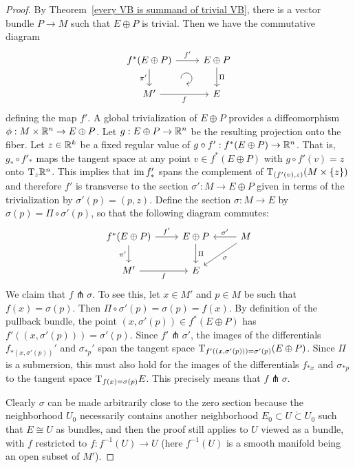 \begin{proof}
By Theorem~\ref{every VB is summand of trivial VB}, there is a vector bundle $P{\to} M$ such that $E\oplus P$ is trivial. Then we have the commutative diagram
    \[\begin{tikzcd}[every matrix/.append style={name=m}, execute at end picture={\draw [<-] ([xshift=-11mm,yshift=1mm]m-2-2.north) arc[start angle=-90,delta angle=270,radius=0.2cm];}]
    f^\ast(E\oplus P) \arrow[r,"f'"]\arrow[d,swap,"\pi'"]& E\oplus P\arrow[d,"\Pi"] \\
    M'\arrow[r,swap,"f"]& E
    \end{tikzcd}\]
defining the map $f'$. A global trivialization of $E\oplus P$ provides a diffeomorphism $\phi:M\times\mathbb{R}^n\to E\oplus P$. Let $g:E\oplus P\to\mathbb{R}^n$ be the resulting projection onto the fiber. Let $z\in\mathbb{R}^k$ be a fixed regular value of $g\circ f':f^\ast(E\oplus P)\to\mathbb{R}^n$. That is, $g_\ast \circ f'_\ast$ maps the tangent space at any point $v\in f^\ast(E\oplus P)$ with $g\circ f'(v)=z$ onto $\mathrm{T}_z\mathbb{R}^n$. This implies that $\operatorname{im} f_\ast '$ spans the complement of $\mathrm{T}_{(f'(v),z)}(M\times\{z\})$ and therefore $f'$ is transverse to the section $\sigma':M\to E\oplus P$ given in terms of the trivialization by $\sigma'(p)=(p,z)$. Define the section $\sigma:M\to E$ by $\sigma(p)=\Pi\circ \sigma'(p)$, so that the following diagram commutes:
  \[\begin{tikzcd}
    f^\ast(E\oplus P) \arrow[r,"f'"]\arrow[d,swap,"\pi'"]& E\oplus P\arrow[d,"\Pi"]& M\arrow[l,swap,"\sigma'"] \arrow[dl,"\sigma"]\\
    M'\arrow[r,swap,"f"]& E &
    \end{tikzcd}\]
We claim that $f\pitchfork \sigma$. To see this, let $x\in M'$ and $p\in M$ be such that $f(x)=\sigma(p)$. Then $\Pi\circ\sigma'(p)=\sigma(p)=f(x)$. By definition of the pullback bundle, the point $(x,\sigma'(p))\in f^\ast(E\oplus P)$ has $f'((x,\sigma'(p)))=\sigma'(p)$. Since $f'\pitchfork \sigma'$, the images of the differentials $f_{\ast(x,\sigma'(p))} '$ and $\sigma_{\ast p}'$ span the tangent space $\mathrm{T}_{f'((x,\sigma'(p)))=\sigma'(p)}(E\oplus P)$. Since $\Pi$ is a submersion, this must also hold for the images of the differentials $f_{\ast x}$ and $\sigma_{\ast p}$ to the tangent space $\mathrm{T}_{f(x)=\sigma(p)}E$. This precisely means that $f\pitchfork\sigma$.

Clearly $\sigma$ can be made arbitrarily close to the zero section because the neighborhood $U_0$ necessarily contains another neighborhood $E_0\subset U\mathring{\subset} U_0$ such that $E\cong U$ as bundles, and then the proof still applies to $U$ viewed as a bundle, with $f$ restricted to $f:f^{-1}(U)\to U$ (here $f^{-1}(U)$ is a smooth manifold being an open subset of $M'$).
\end{proof}

